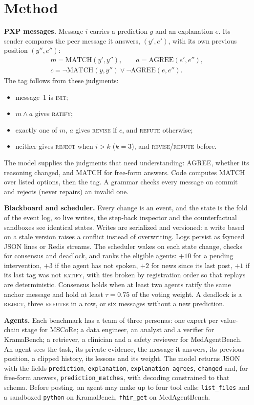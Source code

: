 \documentclass[11pt,a4paper,twocolumn]{article}
\begin{document}
\section{Method}
\textbf{PXP messages.} Message $i$ carries a prediction $y$ and an explanation $e$. Its sender
compares the peer message it answers, $(y',e')$, with its own previous position $(y'',e'')$:
\begin{gather*}
m=\mathrm{MATCH}(y',y''),\qquad a=\mathrm{AGREE}(e',e''),\\
c=\neg\mathrm{MATCH}(y,y'')\lor\neg\mathrm{AGREE}(e,e'').
\end{gather*}
The tag follows from these judgments:
\begin{itemize}
\item message~1 is \textsc{init};
\item $m\land a$ gives \textsc{ratify};
\item exactly one of $m$, $a$ gives \textsc{revise} if $c$, and \textsc{refute} otherwise;
\item neither gives \textsc{reject} when $i>k$ ($k=3$), and \textsc{revise}/\textsc{refute} before.
\end{itemize}
The model supplies the judgments that need understanding: AGREE, whether its reasoning changed,
and MATCH for free-form answers. Code computes MATCH over listed options, then the tag. A
grammar checks every message on commit and rejects (never repairs) an invalid one.

\textbf{Blackboard and scheduler.} Every change is an event, and the state is the fold of the
event log, so live writes, the step-back inspector and the counterfactual sandboxes see
identical states. Writes are serialized and versioned: a write based on a stale version raises a
conflict instead of overwriting. Logs persist as fsynced JSON lines or Redis streams. The
scheduler wakes on each state change, checks for consensus and deadlock, and ranks the eligible
agents: $+10$ for a pending intervention, $+3$ if the agent has not spoken, $+2$ for news since
its last post, $+1$ if its last tag was not \textsc{ratify}, with ties broken by registration
order so that replays are deterministic. Consensus holds when at least two agents ratify the
same anchor message and hold at least $\tau=0.75$ of the voting weight. A deadlock is a
\textsc{reject}, three \textsc{refute}s in a row, or six messages without a new prediction.

\textbf{Agents.} Each benchmark has a team of three personas: one expert per value-chain stage
for MSCoRe; a data engineer, an analyst and a verifier for KramaBench; a retriever, a clinician
and a safety reviewer for MedAgentBench. An agent sees the task, its private evidence, the
message it answers, its previous position, a clipped history, its lessons and its weight. The
model returns JSON with the fields \texttt{prediction}, \texttt{explanation},
\texttt{explanation\_agrees}, \texttt{changed} and, for free-form answers,
\texttt{prediction\_matches}, with decoding constrained to that schema. Before posting, an agent
may make up to four tool calls: \texttt{list\_files} and a sandboxed \texttt{python} on
KramaBench, \texttt{fhir\_get} on MedAgentBench.
\end{document}
